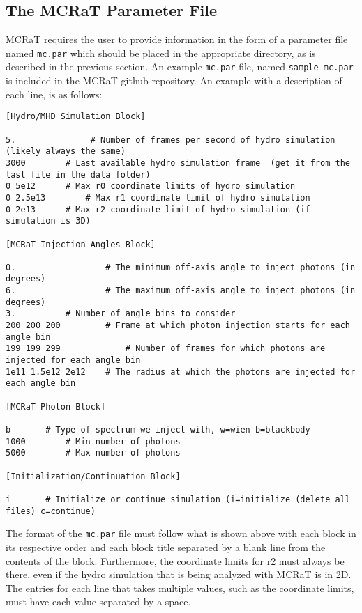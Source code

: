 \documentclass[12pt,a4paper]{article}
\begin{document}
\subsection{The MCRaT Parameter File} \label{mc.par}
MCRaT requires the user to provide information in the form of a parameter file named \texttt{mc.par} which should be placed in the appropriate directory, as is described in the previous section. An example \texttt{mc.par} file, named \texttt{sample\_mc.par} is included in the MCRaT github repository. An example with a description of each line, is as follows:\newpage

{\small
\begin{verbatim}
[Hydro/MHD Simulation Block]

5.               # Number of frames per second of hydro simulation (likely always the same)
3000		# Last available hydro simulation frame  (get it from the last file in the data folder)
0 5e12		# Max r0 coordinate limits of hydro simulation
0 2.5e13		# Max r1 coordinate limit of hydro simulation
0 2e13		# Max r2 coordinate limit of hydro simulation (if simulation is 3D)

[MCRaT Injection Angles Block]

0.               	# The minimum off-axis angle to inject photons (in degrees)
6.               	# The maximum off-axis angle to inject photons (in degrees)
3.			# Number of angle bins to consider
200 200 200      	# Frame at which photon injection starts for each angle bin
199 199 299            	# Number of frames for which photons are injected for each angle bin
1e11 1.5e12 2e12	# The radius at which the photons are injected for each angle bin

[MCRaT Photon Block]

b		# Type of spectrum we inject with, w=wien b=blackbody
1000		# Min number of photons
5000		# Max number of photons

[Initialization/Continuation Block]

i		# Initialize or continue simulation (i=initialize (delete all files) c=continue) 
\end{verbatim}
}

The format of the \texttt{mc.par} file must follow what is shown above with each block in its respective order and each block title separated by a blank line from the contents of the block. Furthermore, the coordinate limits for r2 must always be there, even if the hydro simulation that is being analyzed with MCRaT is in 2D. The entries for each line that takes multiple values, such as the coordinate limits, must have each value separated by a space. 
\end{document}

